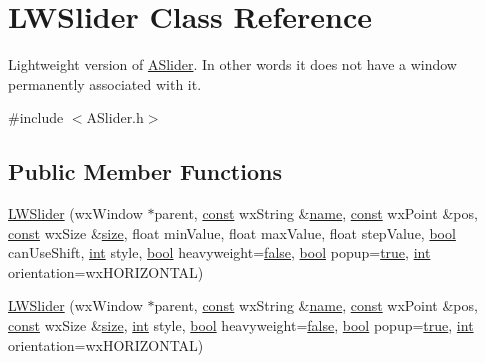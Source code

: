 \hypertarget{class_l_w_slider}{}\section{L\+W\+Slider Class Reference}
\label{class_l_w_slider}


Lightweight version of \hyperlink{class_a_slider}{A\+Slider}. In other words it does not have a window permanently associated with it.  




{\ttfamily \#include $<$A\+Slider.\+h$>$}

\subsection*{Public Member Functions}
\begin{DoxyCompactItemize}
\item 
\hyperlink{class_l_w_slider_ab3d286bbd20815d12b2c5e58ff8a8fc8}{L\+W\+Slider} (wx\+Window $\ast$parent, \hyperlink{getopt1_8c_a2c212835823e3c54a8ab6d95c652660e}{const} wx\+String \&\hyperlink{lib_2expat_8h_a1b49b495b59f9e73205b69ad1a2965b0}{name}, \hyperlink{getopt1_8c_a2c212835823e3c54a8ab6d95c652660e}{const} wx\+Point \&pos, \hyperlink{getopt1_8c_a2c212835823e3c54a8ab6d95c652660e}{const} wx\+Size \&\hyperlink{group__lavu__mem_ga854352f53b148adc24983a58a1866d66}{size}, float min\+Value, float max\+Value, float step\+Value, \hyperlink{mac_2config_2i386_2lib-src_2libsoxr_2soxr-config_8h_abb452686968e48b67397da5f97445f5b}{bool} can\+Use\+Shift, \hyperlink{xmltok_8h_a5a0d4a5641ce434f1d23533f2b2e6653}{int} style, \hyperlink{mac_2config_2i386_2lib-src_2libsoxr_2soxr-config_8h_abb452686968e48b67397da5f97445f5b}{bool} heavyweight=\hyperlink{mac_2config_2i386_2lib-src_2libsoxr_2soxr-config_8h_a65e9886d74aaee76545e83dd09011727}{false}, \hyperlink{mac_2config_2i386_2lib-src_2libsoxr_2soxr-config_8h_abb452686968e48b67397da5f97445f5b}{bool} popup=\hyperlink{mac_2config_2i386_2lib-src_2libsoxr_2soxr-config_8h_a41f9c5fb8b08eb5dc3edce4dcb37fee7}{true}, \hyperlink{xmltok_8h_a5a0d4a5641ce434f1d23533f2b2e6653}{int} orientation=wx\+H\+O\+R\+I\+Z\+O\+N\+T\+AL)
\item 
\hyperlink{class_l_w_slider_ae38d09ecf25d7bba5ccf327e04936838}{L\+W\+Slider} (wx\+Window $\ast$parent, \hyperlink{getopt1_8c_a2c212835823e3c54a8ab6d95c652660e}{const} wx\+String \&\hyperlink{lib_2expat_8h_a1b49b495b59f9e73205b69ad1a2965b0}{name}, \hyperlink{getopt1_8c_a2c212835823e3c54a8ab6d95c652660e}{const} wx\+Point \&pos, \hyperlink{getopt1_8c_a2c212835823e3c54a8ab6d95c652660e}{const} wx\+Size \&\hyperlink{group__lavu__mem_ga854352f53b148adc24983a58a1866d66}{size}, \hyperlink{xmltok_8h_a5a0d4a5641ce434f1d23533f2b2e6653}{int} style, \hyperlink{mac_2config_2i386_2lib-src_2libsoxr_2soxr-config_8h_abb452686968e48b67397da5f97445f5b}{bool} heavyweight=\hyperlink{mac_2config_2i386_2lib-src_2libsoxr_2soxr-config_8h_a65e9886d74aaee76545e83dd09011727}{false}, \hyperlink{mac_2config_2i386_2lib-src_2libsoxr_2soxr-config_8h_abb452686968e48b67397da5f97445f5b}{bool} popup=\hyperlink{mac_2config_2i386_2lib-src_2libsoxr_2soxr-config_8h_a41f9c5fb8b08eb5dc3edce4dcb37fee7}{true}, \hyperlink{xmltok_8h_a5a0d4a5641ce434f1d23533f2b2e6653}{int} orientation=wx\+H\+O\+R\+I\+Z\+O\+N\+T\+AL)

\end{DoxyCompactItemize}
